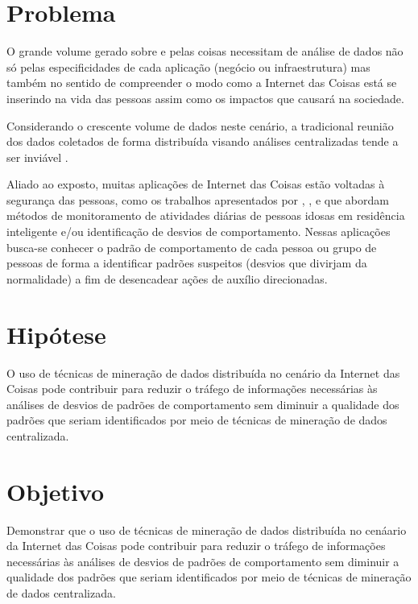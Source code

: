 \section{Problema} \label{sec:problema}

O grande volume gerado sobre e pelas coisas necessitam de análise de dados não só pelas especificidades de cada aplicação (negócio ou infraestrutura) mas também no sentido de compreender o modo como a Internet das Coisas está se inserindo na vida das pessoas assim como os impactos que causará na sociedade.

Considerando o crescente volume de dados neste cenário, a tradicional reunião dos dados coletados de forma distribuída visando análises centralizadas tende a ser inviável \cite{000-000}.

Aliado ao exposto, muitas aplicações de Internet das Coisas estão voltadas à segurança das pessoas, como os trabalhos apresentados por \cite{000-109}, \cite{000-112}, \cite{000-113} e \cite{000-114} que abordam métodos de monitoramento de atividades diárias de pessoas idosas em residência inteligente e/ou identificação de desvios de comportamento. Nessas aplicações busca-se conhecer o padrão de comportamento de cada pessoa ou grupo de pessoas de forma a identificar padrões suspeitos (desvios que divirjam da normalidade) a fim de desencadear ações de auxílio direcionadas.

\section{Hipótese} \label{sec:hipotese}
\begin{hipo}
O uso de técnicas de mineração de dados distribuída no cenário da Internet das Coisas pode contribuir para reduzir o tráfego de informações necessárias às análises de desvios de padrões de comportamento sem diminuir a qualidade dos padrões que seriam identificados por meio de técnicas de mineração de dados centralizada.\end{hipo}

\section{Objetivo} \label{sec:obj}
Demonstrar que o uso de técnicas de mineração de dados distribuída no cenáario da Internet das Coisas pode contribuir para reduzir o tráfego de informações necessárias às análises de desvios de padrões de comportamento sem diminuir a qualidade dos padrões que seriam identificados por meio de técnicas de mineração de dados centralizada.

